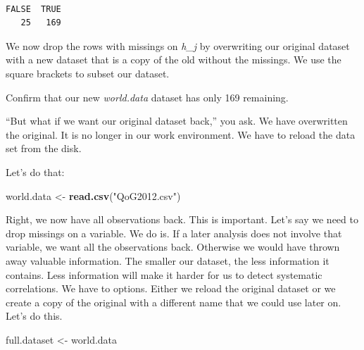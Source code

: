 \documentclass[]{book}
\newenvironment{Shaded}{\begin{snugshade}}{\end{snugshade}}
\newcommand{\KeywordTok}[1]{\textcolor[rgb]{0.13,0.29,0.53}{\textbf{#1}}}
\newcommand{\StringTok}[1]{\textcolor[rgb]{0.31,0.60,0.02}{#1}}
\newcommand{\OperatorTok}[1]{\textcolor[rgb]{0.81,0.36,0.00}{\textbf{#1}}}
\newcommand{\NormalTok}[1]{#1}
\theoremstyle{definition}
\theoremstyle{definition}
\theoremstyle{definition}
\theoremstyle{remark}
\begin{document}
\begin{verbatim}

FALSE  TRUE 
   25   169 
\end{verbatim}

We now drop the rows with missings on \emph{h\_j} by overwriting our
original dataset with a new dataset that is a copy of the old without
the missings. We use the square brackets to subset our dataset.

\begin{Shaded}
\end{Shaded}

Confirm that our new \emph{world.data} dataset has only 169 remaining.

``But what if we want our original dataset back,'' you ask. We have
overwritten the original. It is no longer in our work environment. We
have to reload the data set from the disk.

Let's do that:

\begin{Shaded}
\begin{Highlighting}[]
\NormalTok{world.data <-}\StringTok{ }\KeywordTok{read.csv}\NormalTok{(}\StringTok{"QoG2012.csv"}\NormalTok{)}
\end{Highlighting}
\end{Shaded}

Right, we now have all observations back. This is important. Let's say
we need to drop missings on a variable. We do is. If a later analysis
does not involve that variable, we want all the observations back.
Otherwise we would have thrown away valuable information. The smaller
our dataset, the less information it contains. Less information will
make it harder for us to detect systematic correlations. We have to
options. Either we reload the original dataset or we create a copy of
the original with a different name that we could use later on. Let's do
this.

\begin{Shaded}
\begin{Highlighting}[]
\NormalTok{full.dataset <-}\StringTok{ }\NormalTok{world.data}
\end{Highlighting}
\end{Shaded}
\end{document}
